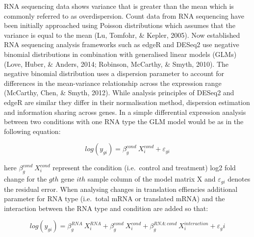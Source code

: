 \documentclass[
  12pt,
  openany]{book}
\begin{document}
RNA sequencing data shows variance that is greater than the mean which is commonly referred to as overdispersion. Count data from RNA sequencing have been initially approached using Poisson distributions which assumes that the variance is equal to the mean (Lu, Tomfohr, \& Kepler, 2005). Now established RNA sequencing analysis frameworks such as edgeR and DESeq2 use negative binomial distributions in combination with generalised linear models (GLMs) (Love, Huber, \& Anders, 2014; Robinson, McCarthy, \& Smyth, 2010). The negative binomial distribution uses a dispersion parameter to account for differences in the mean-variance relationship across the expression range (McCarthy, Chen, \& Smyth, 2012). While analysis principles of DESeq2 and edgeR are similar they differ in their normalisation method, dispersion estimation and information sharing across genes. In a simple differential expression analysis between two conditions with one RNA type the GLM model would be as in the following equation:

\[log(y_{gi}) = \beta_g^{cond}\ X_i^{cond} + \varepsilon_{gi}\]

here \(\beta_g^{cond}\ X_i^{cond}\) represent the condition (i.e.~control and treatment) log2 fold change for the \(gth\) gene \(ith\) sample column of the model matrix X and \(\varepsilon_{gi}\) denotes the residual error. When analysing changes in translation effiencies additional parameter for RNA type (i.e.~total mRNA or translated mRNA) and the interaction between the RNA type and condition are added so that:

\[log(y_{gi}) = \beta_g^{RNA}\ X_i^{RNA}+ \beta_g^{cond}\ X_i^{cond} + \beta_g^{RNA:cond}\ X_i^{interaction} + \varepsilon_gi\]
\end{document}
